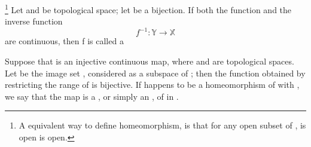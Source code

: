 \begin{definition}[homeomorphism]\label{def:Homeomorphism}\footnote{
      A equivalent way to define homeomorphism, is that for any open subset  of ,  is open \ioi {} is open.
}
      Let  and  be topological space; let  be a bijection. If both the function  and the inverse function
      \begin{equation*}
            f^{-1}: \mathbb{Y} \rightarrow \mathbb{X}
      \end{equation*}
      are continuous, then f is called a 
\end{definition}

\begin{definition}\label{def:TopologicalImbedding}
      Suppose that  is an injective continuous map, where  and  are topological spaces. Let  be the image set , considered as a subspace of ; then the function  obtained by restricting the range of  is bijective. If  happens to be a homeomorphism of  with , we say that the map  is a , or simply an , of  in .
\end{definition}

